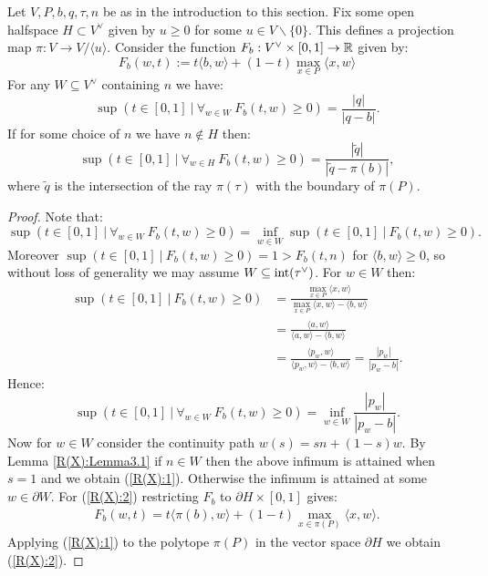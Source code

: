 \begin{corollary}
Let \(V,P,b,q,\tau,n\) be as in the introduction to this section. Fix some open halfspace \(H \subset V^\vee\) given by \(u \ge 0\) for some \(u \in V \backslash \{0\}\). This defines a projection map \(\pi: V \to V/\langle u \rangle.\) Consider the function \(F_b: V^\vee \times  [0,1] \to \mathbb{R}\) given by:
\[
F_b(w,t) := t \langle b,w \rangle+ (1-t) \max_{x \in P} \langle x, w \rangle
\]
For any \(W \subseteq V^\vee\) containing \(n\) we have:
\begin{equation} \label{R(X):1}
\sup (t \in [0,1] \ | \ \forall_{w \in W} \  F_b(t,w) \ge 0) = \frac{|q|}{|q-b|}.
\end{equation}
If for some choice of \(n\) we have \(n \not\in H\) then:
\begin{equation} \label{R(X):2}
\sup (t \in [0,1] \ | \ \forall_{w \in H} \  F_b(t,w) \ge 0) = \frac{|\tilde{q}|}{|\tilde{q} - \pi(b)|},
\end{equation}
where \(\tilde{q}\) is the intersection of the ray \(\pi(\tau)\) with the boundary of \(\pi(P)\).
\end{corollary}
\begin{proof}
Note that:
\[
\sup (t \in [0,1] \ | \ \forall_{w \in W} \  F_b(t,w) \ge 0) = \inf_{w \in W} \sup (t \in [0,1] \ | \  F_b(t,w) \ge 0).
\]
Moreover \(\sup (t \in [0,1] \ | \  F_b(t,w) \ge 0) = 1 > F_b(t,n)\) for \(\langle b,w \rangle \ge 0\), so without loss of generality we may assume \(W \subseteq \text{int}(\tau^\vee)\). For \(w \in W\) then:
\begin{align*}
\sup (t \in [0,1] \ | \  F_b(t,w) \ge 0) &= \frac{\max_{x \in P} \langle x, w \rangle}{ \max_{x \in P} \langle x, w \rangle - \langle b, w \rangle } \\ &= \frac{ \langle a,w \rangle}{\langle a ,w \rangle - \langle b,w \rangle} \\ &= \frac{ \langle p_w,w \rangle}{\langle p_w ,w \rangle - \langle b,w \rangle} = \frac{|p_w|}{|p_w-b|}.
\end{align*}
Hence:
\[
\sup (t \in [0,1] \ | \ \forall_{w \in W} \  F_b(t,w) \ge 0) = \inf_{w \in W} \frac{|p_w|}{|p_w-b|}.
\]
Now for \(w \in W\) consider the continuity path \(w(s) = sn + (1-s)w\). By Lemma \ref{R(X):Lemma3.1} if \(n \in W\) then the above infimum is attained when \(s=1\) and we obtain (\ref{R(X):1}). Otherwise the infimum is attained at some \(w \in \partial W\). For (\ref{R(X):2}) restricting \(F_b\) to \(\partial H \times [0,1]\) gives:
\begin{align*}
F_b(w,t) =  t \langle \pi(b) ,w \rangle+ (1-t) \max_{x \in \pi(P)} \langle x, w \rangle.
\end{align*}
Applying (\ref{R(X):1}) to the polytope \(\pi(P)\) in the vector space \(\partial H\) we obtain (\ref{R(X):2}).
\end{proof}
